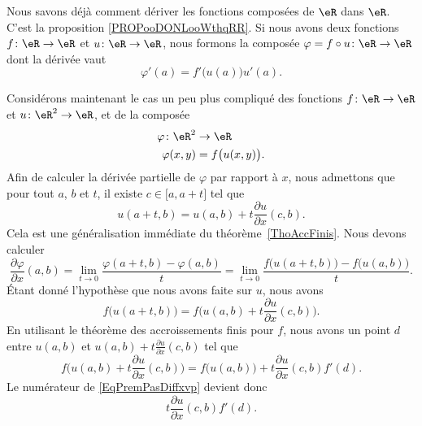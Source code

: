 Nous savons déjà comment dériver les fonctions composées de \( \eR\) dans \( \eR\). C'est la proposition \ref{PROPooDONLooWthqRR}. Si nous avons deux fonctions \( f\colon \eR\to \eR\) et \( u\colon \eR\to \eR\), nous formons la composée \( \varphi=f\circ u\colon \eR\to \eR\) dont la dérivée vaut
\begin{equation}
	\varphi'(a)=f'\big( u(a) \big)u'(a).
\end{equation}

Considérons maintenant le cas un peu plus compliqué des fonctions \( f\colon \eR\to \eR\) et \( u\colon \eR^2\to \eR\), et de la composée
\begin{equation}
	\begin{aligned}
		\varphi\colon \eR^2 & \to \eR                \\
		\varphi(x,y)        & = f\big( u(x,y) \big).
	\end{aligned}
\end{equation}
Afin de calculer la dérivée partielle de \( \varphi\) par rapport à \( x\), nous admettons que pour tout \( a\), \( b\) et \( t\), il existe \( c\in\mathopen[ a , a+t \mathclose]\) tel que
\begin{equation}
	u(a+t,b)=u(a,b)+t\frac{ \partial u }{ \partial x }(c,b).
\end{equation}
Cela est une généralisation immédiate du théorème~\ref{ThoAccFinis}. Nous devons calculer
\begin{equation}		\label{EqPremPasDiffxvp}
	\frac{ \partial \varphi }{ \partial x }(a,b)=\lim_{t\to 0} \frac{ \varphi(a+t,b)-\varphi(a,b) }{ t }=\lim_{t\to 0} \frac{ f\big( u(a+t,b) \big)-f\big( u(a,b) \big) }{ t }.
\end{equation}
Étant donné l'hypothèse que nous avons faite sur \( u\), nous avons
\begin{equation}
	f\big( u(a+t,b) \big)=f\big( u(a,b)+t\frac{ \partial u }{ \partial x }(c,b) \big).
\end{equation}
En utilisant le théorème des accroissements finis pour \( f\), nous avons un point \( d\) entre \( u(a,b)\) et \( u(a,b)+t\frac{ \partial u }{ \partial x }(c,b)\) tel que
\begin{equation}
	f\big( u(a,b)+t\frac{ \partial u }{ \partial x }(c,b) \big)=f\big( u(a,b) \big)+t\frac{ \partial u }{ \partial x }(c,b)f'(d).
\end{equation}
Le numérateur de \eqref{EqPremPasDiffxvp} devient donc
\begin{equation}
	t\frac{ \partial u }{ \partial x }(c,b)f'(d).
\end{equation}
